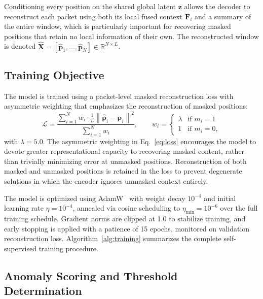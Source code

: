 Conditioning every position on the shared global latent $\mathbf{z}$ allows the decoder to reconstruct each packet using both its local fused context $\mathbf{F}_i$ and a summary of the entire window, which is particularly important for recovering masked positions that retain no local information of their own. The reconstructed window is denoted $\hat{\mathbf{X}} = [\hat{\mathbf{p}}_1, \ldots, \hat{\mathbf{p}}_N] \in \mathbb{R}^{N \times L}$.

\subsection{Training Objective}
\label{sec:loss}
The model is trained using a packet-level masked reconstruction loss with asymmetric weighting that emphasizes the reconstruction of masked positions:
\begin{equation}
    \mathcal{L} = \frac{\displaystyle\sum_{i=1}^{N} w_i \cdot \frac{1}{L} \left\| \hat{\mathbf{p}}_i - \mathbf{p}_i \right\|^2}{\displaystyle\sum_{i=1}^{N} w_i}, \qquad
    w_i =
    \begin{cases}
        \lambda & \text{if } m_i = 1 \\
        1       & \text{if } m_i = 0,
    \end{cases}
    \label{eq:loss}
\end{equation}
with $\lambda = 5.0$. The asymmetric weighting in Eq.~\eqref{eq:loss} encourages the model to devote greater representational capacity to recovering masked content, rather than trivially minimizing error at unmasked positions. Reconstruction of both masked and unmasked positions is retained in the loss to prevent degenerate solutions in which the encoder ignores unmasked context entirely.

The model is optimized using AdamW~\cite{loshchilov2019decoupled} with weight decay $10^{-4}$ and initial learning rate $\eta = 10^{-4}$, annealed via cosine scheduling to $\eta_{\min} = 10^{-6}$ over the full training schedule. Gradient norms are clipped at 1.0 to stabilize training, and early stopping is applied with a patience of 15 epochs, monitored on validation reconstruction loss. Algorithm~\ref{alg:training} summarizes the complete self-supervised training procedure.

\subsection{Anomaly Scoring and Threshold Determination}
\label{sec:scoring}

